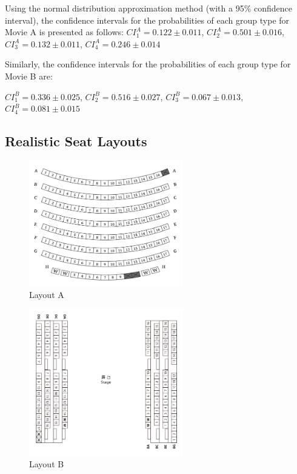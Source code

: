Using the normal distribution approximation method (with a 95\% confidence interval), the confidence intervals for the probabilities of each group type for Movie A is presented as follows:
$CI_1^{A} =  0.122 \pm 0.011$, $CI_2^{A} =  0.501 \pm 0.016$, $CI_3^{A} = 0.132 \pm 0.011$, $CI_4^{A} = 0.246 \pm 0.014$

Similarly, the confidence intervals for the probabilities of each group type for Movie B are:

$CI_1^{B} =  0.336 \pm 0.025$, $CI_2^{B} =  0.516 \pm 0.027$, $CI_3^{B} = 0.067 \pm 0.013$, $CI_4^{B} = 0.081 \pm 0.015$




\subsection{Realistic Seat Layouts}

\begin{figure}[ht]
  \caption{Layout A}
    \centering
      \includegraphics[width=0.6\textwidth]{./Figures/Layouts/Layout_A.png}
\end{figure}
  
\begin{figure}[ht]
  \caption{Layout B}
    \centering
      \includegraphics[width=0.6\textwidth]{./Figures/Layouts/Layout_B.png}
\end{figure}

